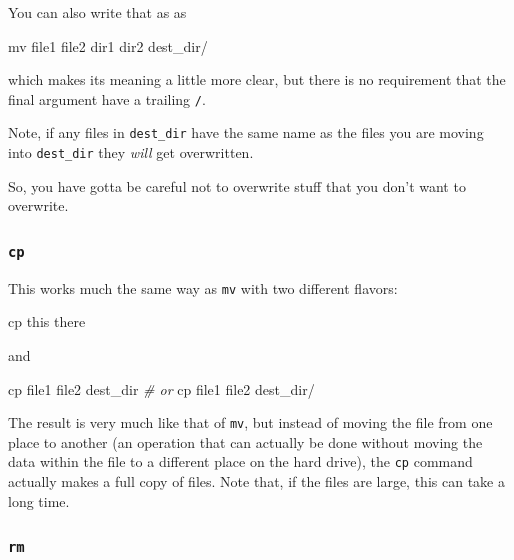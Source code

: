 \documentclass[]{krantz}
\makeatletter
\newenvironment{Shaded}{\begin{snugshade}}{\end{snugshade}}
\newcommand{\CommentTok}[1]{\textcolor[rgb]{0.37,0.37,0.37}{\textit{#1}}}
\newcommand{\FunctionTok}[1]{\textcolor[rgb]{0,0,0}{#1}}
\newcommand{\NormalTok}[1]{#1}
\newenvironment{kframe}{%
\medskip{}
\setlength{\fboxsep}{.8em}
 \def\at@end@of@kframe{}%
 \ifinner\ifhmode%
  \def\at@end@of@kframe{\end{minipage}}%
  \begin{minipage}{\columnwidth}%
 \fi\fi%
 \def\FrameCommand##1{\hskip\@totalleftmargin \hskip-\fboxsep
 \colorbox{shadecolor}{##1}\hskip-\fboxsep
     \hskip-\linewidth \hskip-\@totalleftmargin \hskip\columnwidth}%
 \MakeFramed {\advance\hsize-\width
   \@totalleftmargin\z@ \linewidth\hsize
   \@setminipage}}%
 {\par\unskip\endMakeFramed%
 \at@end@of@kframe}
\renewenvironment{Shaded}{\begin{kframe}}{\end{kframe}}
\makeatother
\begin{document}
You can also write that as as

\begin{Shaded}
\begin{Highlighting}[]
\FunctionTok{mv}\NormalTok{ file1 file2 dir1 dir2 dest_dir/}
\end{Highlighting}
\end{Shaded}

which makes its meaning a little more clear, but there is no requirement that the
final argument have a trailing \texttt{/}.

Note, if any files in \texttt{dest\_dir} have the same name as the files you are moving into
\texttt{dest\_dir} they \emph{will} get overwritten.

So, you have gotta be careful not to overwrite stuff that you don't want to overwrite.

\hypertarget{cp}{%
\subsubsection{\texorpdfstring{\texttt{cp}}{cp}}\label{cp}}

This works much the same way as \texttt{mv} with two different flavors:

\begin{Shaded}
\begin{Highlighting}[]
\FunctionTok{cp}\NormalTok{ this there}
\end{Highlighting}
\end{Shaded}

and

\begin{Shaded}
\begin{Highlighting}[]
\FunctionTok{cp}\NormalTok{ file1 file2 dest_dir}
\CommentTok{# or}
\FunctionTok{cp}\NormalTok{ file1 file2 dest_dir/}
\end{Highlighting}
\end{Shaded}

The result is very much like that of \texttt{mv}, but instead of moving the file
from one place to another (an operation that can actually be done without moving the
data within the file to a different place on the hard drive), the \texttt{cp} command actually
makes a full copy of files. Note that, if the files are large, this can take a long time.

\hypertarget{rm}{%
\subsubsection{\texorpdfstring{\texttt{rm}}{rm}}\label{rm}}
\end{document}
